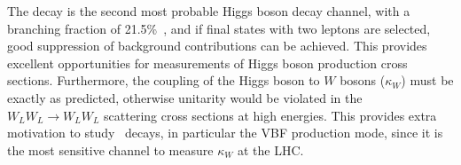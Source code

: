 The \HWW decay is the second most probable Higgs boson decay channel, with a branching fraction of 21.5\%~\cite{PDG2020}, and if final states with two leptons are selected, good suppression of background contributions can be achieved.
This provides excellent opportunities for measurements of Higgs boson production cross sections.
Furthermore, the coupling of the Higgs boson to $W$ bosons ($\kappa_W$) must be exactly as predicted, otherwise unitarity would be violated in the $W_LW_L \to W_LW_L$ scattering cross sections at high energies.
This provides extra motivation to study \HWW\ decays, in particular the VBF production mode, since it is the most sensitive channel to measure $\kappa_W$ at the LHC.

